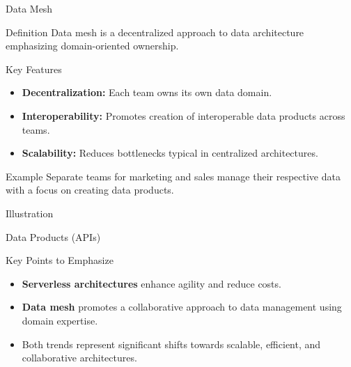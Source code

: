 \documentclass[aspectratio=169]{beamer}
\begin{document}
\begin{frame}[fragile]{Data Mesh}
    \begin{block}{Definition}
        Data mesh is a decentralized approach to data architecture emphasizing domain-oriented ownership.
    \end{block}
    
    \begin{block}{Key Features}
        \begin{itemize}
            \item \textbf{Decentralization:} Each team owns its own data domain.
            \item \textbf{Interoperability:} Promotes creation of interoperable data products across teams.
            \item \textbf{Scalability:} Reduces bottlenecks typical in centralized architectures.
        \end{itemize}
    \end{block}
    
    \begin{block}{Example}
        Separate teams for marketing and sales manage their respective data with a focus on creating data products.
    \end{block}
    
    \begin{block}{Illustration}
        \begin{center}
        \end{center}
        Data Products (APIs)
    \end{block}
\end{frame}

\begin{frame}[fragile]{Key Points to Emphasize}
    \begin{itemize}
        \item \textbf{Serverless architectures} enhance agility and reduce costs.
        \item \textbf{Data mesh} promotes a collaborative approach to data management using domain expertise.
        \item Both trends represent significant shifts towards scalable, efficient, and collaborative architectures.
    \end{itemize}
\end{frame}
\end{document}
